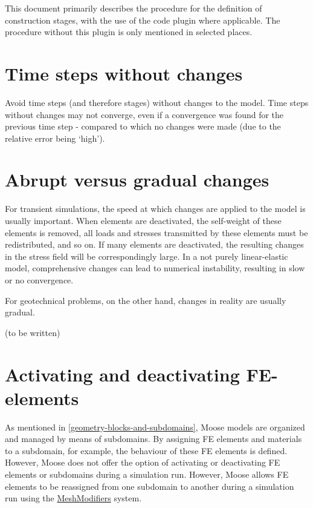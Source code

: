 This document primarily describes the procedure for the definition of
construction stages, with the use of the \codeword{[Stages]} code plugin where
applicable. The procedure without this plugin is only mentioned in selected
places.

\section{Time steps without changes}
\label{chap:stages-without-changes}

Avoid time steps (and therefore stages) without changes to the model. Time
steps without changes may not converge, even if a convergence was found for the
previous time step - compared to which no changes were made (due to the
relative error being ‘high’).


\section{Abrupt versus gradual changes}
\label{chap:stages-gradual-changes}

For transient simulations, the speed at which changes are applied to the model
is usually important. When elements are deactivated, the self-weight of these
elements is removed, all loads and stresses transmitted by these elements must
be redistributed, and so on. If many elements are deactivated, the resulting
changes in the stress field will be correspondingly large. In a not purely
linear-elastic model, comprehensive changes can lead to numerical instability,
resulting in slow or no convergence.

For geotechnical problems, on the other hand, changes in reality are usually
gradual.

(to be written)

\section{Activating and deactivating FE-elements}
\label{chap:stages-element-activation-deactivation}

As mentioned in \autoref{geometry-blocks-and-subdomains}, Moose models are
organized and managed by means of subdomains. By assigning FE elements and
materials to a subdomain, for example, the behaviour of these FE elements is
defined. However, Moose does not offer the option of activating or deactivating
FE elements or subdomains during a simulation run. However, Moose allows FE
elements to be reassigned from one subdomain to another during a simulation run
using the
\href{https://mooseframework.inl.gov/syntax/MeshModifiers/index.html}{MeshModifiers}
system.

